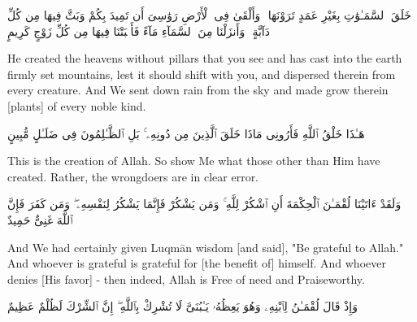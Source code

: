 \begin{edition*}
	\begin{Arabic}
		خَلَقَ ٱلسَّمَـٰوَٰتِ بِغَيْرِ عَمَدٍ تَرَوْنَهَا ۖ وَأَلْقَىٰ فِى ٱلْأَرْضِ رَوَٰسِىَ أَن تَمِيدَ بِكُمْ وَبَثَّ فِيهَا مِن كُلِّ دَآبَّةٍ ۚ وَأَنزَلْنَا مِنَ ٱلسَّمَآءِ مَآءً فَأَنۢبَتْنَا فِيهَا مِن كُلِّ زَوْجٍ كَرِيمٍ
	\end{Arabic}
\end{edition*}

\begin{translation}
	He created the heavens without pillars that you see and has cast into the earth firmly set mountains, lest it should shift with you, and dispersed therein from every creature. And We sent down rain from the sky and made grow therein [plants] of every noble kind.
\end{translation}


\begin{edition*}
	\begin{Arabic}
		هَـٰذَا خَلْقُ ٱللَّهِ فَأَرُونِى مَاذَا خَلَقَ ٱلَّذِينَ مِن دُونِهِۦ ۚ بَلِ ٱلظَّـٰلِمُونَ فِى ضَلَـٰلٍ مُّبِينٍ
	\end{Arabic}
\end{edition*}

\begin{translation}
	This is the creation of Allah. So show Me what those other than Him have created. Rather, the wrongdoers are in clear error.
\end{translation}


\begin{edition*}
	\begin{Arabic}
		وَلَقَدْ ءَاتَيْنَا لُقْمَـٰنَ ٱلْحِكْمَةَ أَنِ ٱشْكُرْ لِلَّهِ ۚ وَمَن يَشْكُرْ فَإِنَّمَا يَشْكُرُ لِنَفْسِهِۦ ۖ وَمَن كَفَرَ فَإِنَّ ٱللَّهَ غَنِىٌّ حَمِيدٌ
	\end{Arabic}
\end{edition*}

\begin{translation}
	And We had certainly given Luqmān wisdom [and said], "Be grateful to Allah." And whoever is grateful is grateful for [the benefit of] himself. And whoever denies [His favor] - then indeed, Allah is Free of need and Praiseworthy.
\end{translation}


\begin{edition*}
	\begin{Arabic}
		وَإِذْ قَالَ لُقْمَـٰنُ لِٱبْنِهِۦ وَهُوَ يَعِظُهُۥ يَـٰبُنَىَّ لَا تُشْرِكْ بِٱللَّهِ ۖ إِنَّ ٱلشِّرْكَ لَظُلْمٌ عَظِيمٌ
	\end{Arabic}
\end{edition*}

